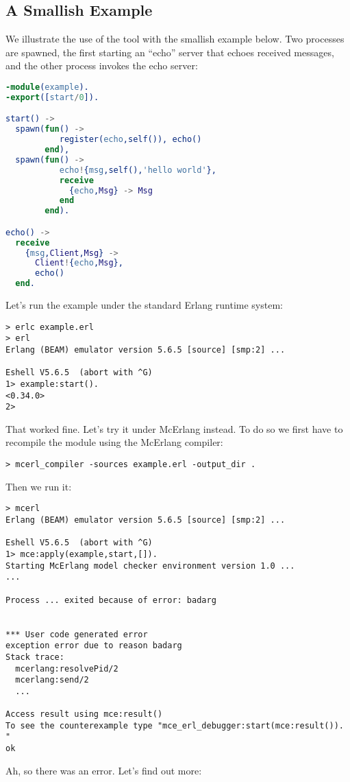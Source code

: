 \documentclass[a4paper]{article}
\begin{document}
\subsection{A Smallish Example}
\label{sect_example}

We illustrate the use of the tool with the smallish example below.
Two processes are spawned, the first starting an ``echo'' server
that echoes received messages, and the other process invokes the echo
server:
\begin{lstlisting}[language=Erlang]
-module(example). 
-export([start/0]).

start() -> 
  spawn(fun() -> 
           register(echo,self()), echo() 
        end),
  spawn(fun() -> 
           echo!{msg,self(),'hello world'},
           receive
             {echo,Msg} -> Msg
           end
        end).

echo() ->
  receive
    {msg,Client,Msg} ->
      Client!{echo,Msg},
      echo()
  end.
\end{lstlisting}
\noindent
Let's run the example under the standard Erlang runtime system:
\begin{lstlisting}
> erlc example.erl
> erl
Erlang (BEAM) emulator version 5.6.5 [source] [smp:2] ...

Eshell V5.6.5  (abort with ^G)
1> example:start().
<0.34.0>
2> 
\end{lstlisting}
\noindent
That worked fine. Let's try it under McErlang instead.
To do so we first have to recompile the module
using the McErlang compiler:
\begin{lstlisting}
> mcerl_compiler -sources example.erl -output_dir .
\end{lstlisting}
\noindent
Then we run it:
\begin{lstlisting}
> mcerl
Erlang (BEAM) emulator version 5.6.5 [source] [smp:2] ...

Eshell V5.6.5  (abort with ^G)
1> mce:apply(example,start,[]).
Starting McErlang model checker environment version 1.0 ...
...

Process ... exited because of error: badarg


*** User code generated error
exception error due to reason badarg
Stack trace:
  mcerlang:resolvePid/2
  mcerlang:send/2
  ...
 
Access result using mce:result()
To see the counterexample type "mce_erl_debugger:start(mce:result()). "
ok
\end{lstlisting}
\noindent
Ah, so there was an error. Let's find out more:
\end{document}
